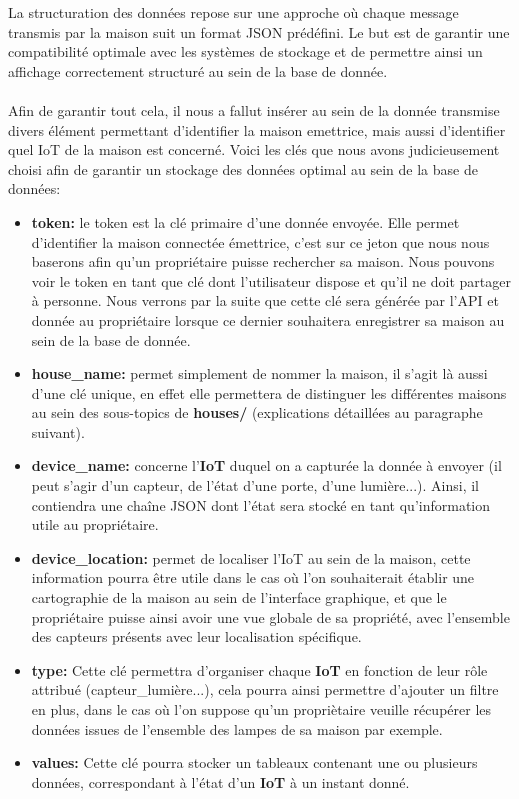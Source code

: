 \documentclass[10pt, a4paper]{report}
\begin{document}
	La structuration des données repose sur une approche où chaque message transmis par la maison suit un format JSON prédéfini. Le but est de garantir une compatibilité optimale avec les systèmes de stockage et de permettre ainsi un affichage correctement structuré au sein de la base de donnée.\\\\
	Afin de garantir tout cela, il nous a fallut insérer au sein de la donnée transmise divers élément permettant d'identifier la maison emettrice, mais aussi d'identifier quel IoT de la maison est concerné. Voici les clés que nous avons judicieusement choisi afin de garantir un stockage des données optimal au sein de la base de données:
	\begin{itemize}
		\item \textbf{token:} le token est la clé primaire d'une donnée envoyée. Elle permet d'identifier la maison connectée émettrice, c'est sur ce jeton que nous nous baserons afin qu'un propriétaire puisse rechercher sa maison. Nous pouvons voir le token en tant que clé dont l'utilisateur dispose et qu'il ne doit partager à personne. Nous verrons par la suite que cette clé sera générée par l'API et donnée au propriétaire lorsque ce dernier souhaitera enregistrer sa maison au sein de la base de donnée.
		
		\item \textbf{house\_name:} permet simplement de nommer la maison, il s'agit là aussi d'une clé unique, en effet elle permettera de distinguer les différentes maisons au sein des sous-topics de \textbf{houses/} (explications détaillées au paragraphe suivant).
		
		\item \textbf{device\_name:} concerne l'\textbf{IoT} duquel on a capturée la donnée à envoyer (il peut s'agir d'un capteur, de l'état d'une porte, d'une lumière...). Ainsi, il contiendra une chaîne JSON dont l'état sera stocké en tant qu'information utile au propriétaire.
		
		\item \textbf{device\_location:} permet de localiser l'IoT au sein de la maison, cette information pourra être utile dans le cas où l'on souhaiterait établir une cartographie de la maison au sein de l'interface graphique, et que le propriétaire puisse ainsi avoir une vue globale de sa propriété, avec l'ensemble des capteurs présents avec leur localisation spécifique.
		
		\item \textbf{type:} Cette clé permettra d'organiser chaque \textbf{IoT} en fonction de leur rôle attribué (capteur\_lumière...), cela pourra ainsi permettre d'ajouter un filtre en plus, dans le cas où l'on suppose qu'un propriètaire veuille récupérer les données issues de l'ensemble des lampes de sa maison par exemple.
		
		\item \textbf{values:} Cette clé pourra stocker un tableaux contenant une ou plusieurs données, correspondant à l'état d'un \textbf{IoT} à un instant donné.
	\end{itemize}
	
\end{document}
